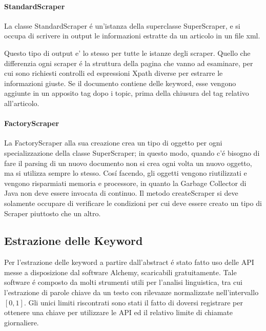 \documentclass[11pt,twoside,a4paper]{article}
\begin{document}
\paragraph{StandardScraper}
\label{par:standardscraper}
La classe StandardScraper \'e un'istanza della superclasse SuperScraper, e si occupa di scrivere in output le informazioni estratte da un articolo in un file xml.


Questo tipo di output e' lo stesso per tutte le istanze degli scraper. Quello che differenzia ogni scraper \'e la struttura della pagina che vanno ad esaminare, per cui sono richiesti controlli ed espressioni Xpath diverse per estrarre le informazioni giuste. Se il documento contiene delle keyword, esse vengono aggiunte in un apposito tag dopo i topic, prima della chiusura del tag relativo all'articolo.



\paragraph{FactoryScraper}
\label{par:factoryscraper}



La FactoryScraper alla sua creazione crea un tipo di oggetto per ogni specializzazione della classe SuperScraper; in questo modo, quando c'\'e bisogno di fare il parsing di un nuovo documento non si crea ogni volta un nuovo oggetto, ma si utilizza sempre lo stesso. Cos\'i facendo, gli oggetti vengono riutilizzati e vengono risparmiati memoria e processore, in quanto la Garbage Collector di Java non deve essere invocata di continuo. Il metodo createScraper si deve solamente occupare di verificare le condizioni per cui deve essere creato un tipo di Scraper piuttosto che un altro.

\subsection{Estrazione delle Keyword}
Per l'estrazione delle keyword a partire dall'abstract \'e stato fatto uso delle API messe a disposizione dal software Alchemy\cite{alchemy}, scaricabili gratuitamente. Tale software \'e composto da molti strumenti utili per l'analisi linguistica, tra cui l'estrazione di parole chiave da un testo con rilevanze normalizzate nell'intervallo $[0,1]$. Gli unici limiti riscontrati sono stati il fatto di doversi registrare per ottenere una chiave per utilizzare le API ed il relativo limite di chiamate giornaliere.
\end{document}
